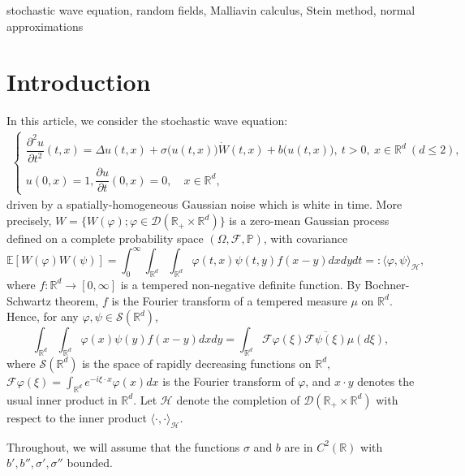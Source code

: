 \documentclass[12pt]{article}
\def\cD{\mathcal{D}}
\def\cF{\mathcal{F}}
\def\cH{\mathcal{H}}
\def\cS{\mathcal{S}}
\def\bE{\mathbb{E}}
\def\bP{\mathbb{P}}
\def\bR{\mathbb{R}}
\begin{document}
\vspace{1mm}

 stochastic wave equation, random fields, Malliavin calculus, Stein method, normal approximations

\pagebreak

\tableofcontents




\section{Introduction}

In this article, we consider the stochastic wave equation:
\begin{align}
\label{SWE}
	\begin{cases}
		\dfrac{\partial^2 u}{\partial t^2} (t,x)
		=  \Delta u (t,x)+\sigma\big(u(t,x)\big) \dot{W}(t,x)+b\big(u(t,x) \big), \ 
		t>0, \ x \in \bR^d \ (d\leq 2), \\
		u(0,x) = 1, \dfrac{\partial u}{\partial t} (0,x)=0, \quad x \in \bR^d,
	\end{cases}
\end{align}
driven by a spatially-homogeneous Gaussian noise which is white in time. More precisely, $W=\{W(\varphi);\varphi \in \cD(\bR_{+} \times \bR^d)\}$ is a zero-mean Gaussian process defined on a complete probability space $(\Omega,\cF,\bP)$, with covariance
\[
\bE[W(\varphi)W(\psi)]=\int_0^{\infty} \int_{\bR^d} \int_{\bR^d}\varphi(t,x)\psi(t,y)f(x-y)dxdydt=:\langle \varphi,\psi \rangle_{\cH},
\] 
where $f:\bR^d \to [0,\infty]$ is a tempered non-negative definite function.  By Bochner-Schwartz theorem, $f$ is the  Fourier transform of a tempered measure $\mu$ on $\bR^d$. Hence, for any $\varphi,\psi \in \cS(\bR^d)$,
\[
\int_{\bR^d} \int_{\bR^d}\varphi(x)\psi(y) f(x-y)dxdy=\int_{\bR^d}\cF \varphi(\xi) \overline{\cF \psi(\xi)}\mu(d\xi),
\]
where $\cS(\bR^d)$ is the space of rapidly decreasing functions on $\bR^d$, $\cF \varphi(\xi)=\int_{\bR^d} e^{-i\xi \cdot x} \varphi(x)dx$ is the Fourier transform of $\varphi$, and $x\cdot y$ denotes the usual inner product in $\bR^d$. Let $\cH$ denote the completion of $\cD(\bR_{+} \times \bR^d)$ with respect to the inner product $\langle \cdot,\cdot \rangle_{\cH}$. 

Throughout, we will assume that the functions $\sigma$ and $b$ are in $C^2(\bR)$ with $b',b'',\sigma',\sigma''$ bounded.
\end{document}
